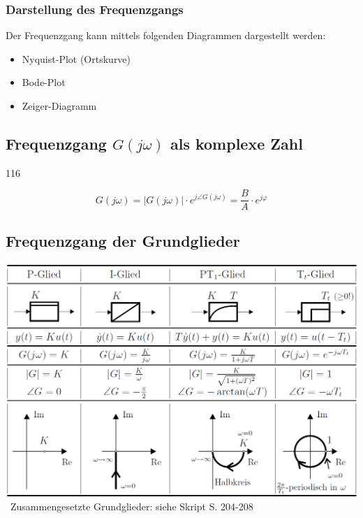 \subsubsection{Darstellung des Frequenzgangs}

Der Frequenzgang kann mittels folgenden Diagrammen dargestellt werden: 

\begin{itemize}
    \item Nyquist-Plot (Ortskurve)
    \item Bode-Plot
    \item Zeiger-Diagramm %
\end{itemize}


\subsection[Frequenzgang G(j omega) als komplexe Zahl]{Frequenzgang $G(j \omega)$ als komplexe Zahl}{116}

\vspace{-0.3cm} %
$$ \boxed{ G(j \omega) = |G(j \omega)| \cdot e^{j \angle G(j \omega)} = \frac{B}{A} \cdot e^{j  \varphi} } $$


\subsection{Frequenzgang der Grundglieder}

\includegraphics[width=\columnwidth]{images/frequenzgaenge_grundglieder.png} \\
\textrightarrow\ Zusammengesetzte Grundglieder: siehe Skript S. 204-208


